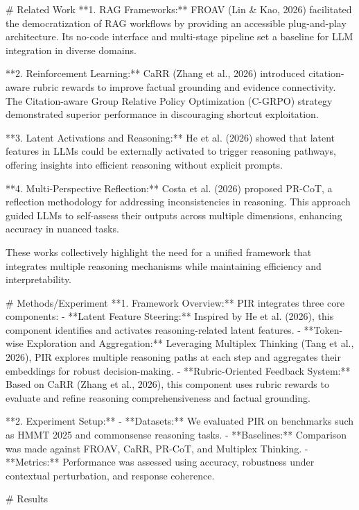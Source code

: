 # Related Work  
**1. RAG Frameworks:**  
FROAV (Lin & Kao, 2026) facilitated the democratization of RAG workflows by providing an accessible plug-and-play architecture. Its no-code interface and multi-stage pipeline set a baseline for LLM integration in diverse domains.  

**2. Reinforcement Learning:**  
CaRR (Zhang et al., 2026) introduced citation-aware rubric rewards to improve factual grounding and evidence connectivity. The Citation-aware Group Relative Policy Optimization (C-GRPO) strategy demonstrated superior performance in discouraging shortcut exploitation.  

**3. Latent Activations and Reasoning:**  
He et al. (2026) showed that latent features in LLMs could be externally activated to trigger reasoning pathways, offering insights into efficient reasoning without explicit prompts.  

**4. Multi-Perspective Reflection:**  
Costa et al. (2026) proposed PR-CoT, a reflection methodology for addressing inconsistencies in reasoning. This approach guided LLMs to self-assess their outputs across multiple dimensions, enhancing accuracy in nuanced tasks.  

These works collectively highlight the need for a unified framework that integrates multiple reasoning mechanisms while maintaining efficiency and interpretability.

# Methods/Experiment  
**1. Framework Overview:**  
PIR integrates three core components:  
- **Latent Feature Steering:** Inspired by He et al. (2026), this component identifies and activates reasoning-related latent features.  
- **Token-wise Exploration and Aggregation:** Leveraging Multiplex Thinking (Tang et al., 2026), PIR explores multiple reasoning paths at each step and aggregates their embeddings for robust decision-making.  
- **Rubric-Oriented Feedback System:** Based on CaRR (Zhang et al., 2026), this component uses rubric rewards to evaluate and refine reasoning comprehensiveness and factual grounding.

**2. Experiment Setup:**  
- **Datasets:** We evaluated PIR on benchmarks such as HMMT 2025 and commonsense reasoning tasks.  
- **Baselines:** Comparison was made against FROAV, CaRR, PR-CoT, and Multiplex Thinking.  
- **Metrics:** Performance was assessed using accuracy, robustness under contextual perturbation, and response coherence.

# Results  


